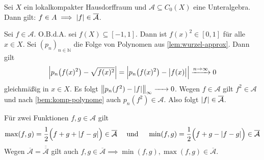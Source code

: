 \begin{lemma}[{name=[Betrag im Abschluss der Unteralgebra]},label=lem:abschluss-betrag]
	Sei $X$ ein lokalkompakter Hausdorffraum und $\mathcal{A} \subseteq C_0(X)$ eine Unteralgebra. 
	Dann gilt: $f \in A \implies \abs*{f} \in \overline{\mathcal{A}}$.
\end{lemma}
\begin{beweis}
	Sei $f \in \mathcal{A}$. O.B.d.A. sei $f(X) \subseteq [{-1},1]$. 
	Dann ist $f(x)^2 \in [0,1]$ für alle $x \in X$. Sei $(p_n)_{n \in \mathbb{N}}$ die Folge von Polynomen aus 
	\cref{lem:wurzel-approx}. 
	Dann gilt
	\[
		\abs*{p_n \enbrace*{f(x)^2} - \sqrt{f(x)^2}} = \abs[\Big]{ p_n \enbrace*{f(x)^2} - \abs[\big]{f(x)}} \grenzw{n \to \infty}  0 
	\]
	gleichmäßig in $x \in X$. 
	Es folgt $\norm[\big]{p_n(f^2) - \abs*{f}}_\infty \grenzw{} 0$. 
	Wegen $f \in \mathcal{A} $ gilt $f^2 \in \mathcal{A}$ und nach \cref{bem:komp-polynome} auch $p_n(f^2) \in \mathcal{A}$.
	Also folgt $\abs*{f} \in \overline{\mathcal{A}}$.
\end{beweis}

\begin{bemerkung}[{name=[Max und Min von Funktionen im Abschluss]},label=bem:minmax-abschluss]
	Für zwei Funktionen $f,g \in \mathcal{A}$ gilt
	\[
		\max(f,g) = \frac{1}{2} \enbrace[\Big]{f+g + \abs*{f-g}} \in\overline{\mathcal{A}} \quad \text{ und } \quad\min(f,g) = \frac{1}{2} \enbrace[\Big]{f+g - \abs*{f-g} } \in \overline{\mathcal{A}}
	\]
	Wegen $\overline{\mathcal{A} } = \overline{\overline{\mathcal{A}}}$ gilt auch $f,g \in \overline{\mathcal{A}} \implies \min(f,g), \max(f,g) \in \overline{\mathcal{A}}$.
\end{bemerkung}

